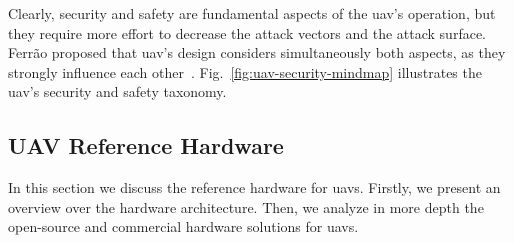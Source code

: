 Clearly, security and safety are fundamental aspects of the \gls{uav}'s
operation, but they require more effort to decrease the attack vectors and the
attack surface. Ferrão proposed that \gls{uav}'s design considers simultaneously
both aspects, as they strongly influence each
other~\cite{ferrao2020stuart}. Fig.~\ref{fig:uav-security-mindmap} illustrates the
\gls{uav}'s security and safety taxonomy.



\subsection{UAV Reference Hardware}%
\label{sec:uav-ref-hw}
In this section we discuss the reference hardware for \glspl{uav}.
Firstly, we present an overview over the hardware architecture. Then, we analyze
in more depth the open-source and commercial hardware solutions for \glspl{uav}.

